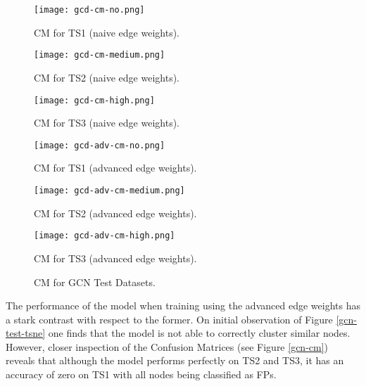 \begin{figure}[htb]
  \centering
  \begin{minipage}{0.32\textwidth}
    \centering
    \texttt{[image: gcd-cm-no.png]}
    \caption{CM for TS1 (naive edge weights).}
  \end{minipage}
  \begin{minipage}{0.32\textwidth}
    \centering
    \texttt{[image: gcd-cm-medium.png]}
    \caption{CM for TS2 (naive edge weights).}
  \end{minipage}
  \begin{minipage}{0.32\textwidth}
    \centering
    \texttt{[image: gcd-cm-high.png]}
    \caption{CM for TS3 (naive edge weights).}
  \end{minipage}
  \begin{minipage}{0.32\textwidth}
    \centering
    \texttt{[image: gcd-adv-cm-no.png]}
    \caption{CM for TS1 (advanced edge weights).}
  \end{minipage}
  \begin{minipage}{0.32\textwidth}
    \centering
    \texttt{[image: gcd-adv-cm-medium.png]}
    \caption{CM for TS2 (advanced edge weights).}
  \end{minipage}
  \begin{minipage}{0.32\textwidth}
    \centering
    \texttt{[image: gcd-adv-cm-high.png]}
    \caption{CM for TS3 (advanced edge weights).}
  \end{minipage}  
  \caption{CM for GCN Test Datasets.}
  \label{fig:gcn-cm}
\end{figure}

The performance of the model when training using the advanced edge
weights has a stark contrast with respect to the former. On initial
observation of Figure \ref{gcn-test-tsne} one finds that the model is
not able to correctly cluster similar nodes. However, closer
inspection of the Confusion Matrices (see Figure \ref{gcn-cm}) reveals
that although the model performs perfectly on TS2 and TS3, it has an
accuracy of zero on TS1 with all nodes being classified as FPs.

